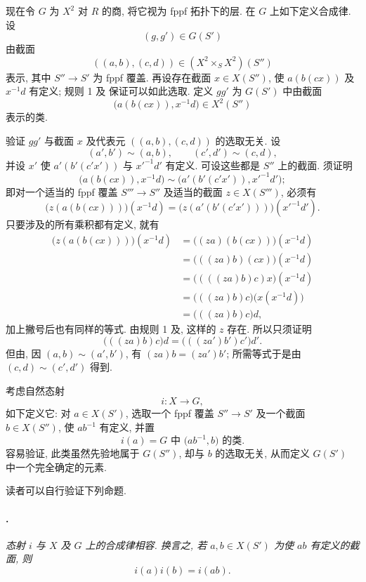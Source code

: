 现在令 \(G\) 为 \(X^2\) 对 \(R\) 的商, 将它视为 fppf 拓扑下的层.
在 \(G\) 上如下定义合成律. 设
\[
  (g,g')\in G(S')
\]
由截面
\[
  ((a,b),(c,d))\in (X^2\times_S X^2)(S'')
\]
表示, 其中 \(S''\to S'\) 为 fppf 覆盖.
再设存在截面 \(x\in X(S'')\), 使 \(a(b(cx))\) 及 \(x^{-1}d\) 有定义;
规则 1 及 保证可以如此选取.
定义 \(gg'\) 为 \(G(S')\) 中由截面
\[
  \bigl(a(b(cx)),x^{-1}d\bigr)\in X^2(S'')
\]
表示的类.

验证 \(gg'\) 与截面 \(x\) 及代表元 \(((a,b),(c,d))\) 的选取无关.
设
\[
  (a',b')\sim(a,b),\qquad (c',d')\sim(c,d),
\]
并设 \(x'\) 使 \(a'(b'(c'x'))\) 与 \({x'}^{-1}d'\) 有定义.
可设这些都是 \(S''\) 上的截面. 须证明
\[
  \bigl(a(b(cx)),x^{-1}d\bigr)
  \sim
  \bigl(a'(b'(c'x')),{x'}^{-1}d'\bigr);
\]
即对一个适当的 fppf 覆盖 \(S'''\to S''\)
及适当的截面 \(z\in X(S''')\), 必须有
\[
 \bigl(z(a(b(cx)))\bigr)(x^{-1}d)
 =
 \bigl(z(a'(b'(c'x')))\bigr)({x'}^{-1}d').
\]
只要涉及的所有乘积都有定义, 就有
\[
\begin{aligned}
 \bigl(z(a(b(cx)))\bigr)(x^{-1}d)
 &=\bigl((za)(b(cx))\bigr)(x^{-1}d)\\
 &=\bigl(((za)b)(cx)\bigr)(x^{-1}d)\\
 &=\bigl((((za)b)c)x\bigr)(x^{-1}d)\\
 &=\bigl(((za)b)c\bigr)\bigl(x(x^{-1}d)\bigr)\\
 &=\bigl(((za)b)c\bigr)d,
\end{aligned}
\]
加上撇号后也有同样的等式.
由规则 1 及, 这样的 \(z\) 存在.
所以只须证明
\[
  \bigl(((za)b)c\bigr)d
  =
  \bigl(((za')b')c'\bigr)d'.
\]
但由,
因 \((a,b)\sim(a',b')\), 有 \((za)b=(za')b'\);
所需等式于是由 \((c,d)\sim(c',d')\) 得到.

考虑自然态射
\[
  i\colon X\longrightarrow G,
\]
如下定义它: 对 \(a\in X(S')\), 选取一个 fppf 覆盖 \(S''\to S'\)
及一个截面 \(b\in X(S'')\), 使 \(ab^{-1}\) 有定义, 并置
\[
  i(a)=\text{\(G\) 中 }\bigl(ab^{-1},b\bigr)\text{ 的类}.
\]
容易验证, 此类虽然先验地属于 \(G(S'')\),
却与 \(b\) 的选取无关, 从而定义 \(G(S')\) 中一个完全确定的元素.

读者可以自行验证下列命题.

\paragraph{.}
\textit{态射 \(i\) 与 \(X\) 及 \(G\) 上的合成律相容.
换言之, 若 \(a,b\in X(S')\) 为使 \(ab\) 有定义的截面, 则
\[
  i(a)i(b)=i(ab).
\]}

